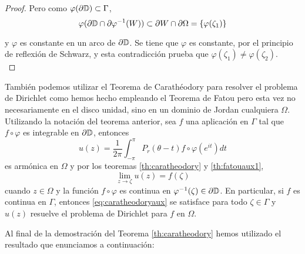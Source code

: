 \begin{proof}
    Pero como $\varphi(\partial \mathbb{D}) \subset \Gamma$,
    \begin{equation*}
        \varphi(\partial \mathbb{D} \cap \partial \varphi ^{-1} (W)) \subset \partial W \cap \partial \Omega = \{ \varphi (\zeta_1)\}
    \end{equation*}

    y $\varphi$ es constante en un arco de $\partial \mathbb{D}$. Se tiene que $\varphi$ es constante, por el principio de reflexión de Schwarz, y esta contradicción prueba que $\varphi(\zeta_1) \not = \varphi(\zeta_2)$. \\
\end{proof}


También podemos utilizar el Teorema de Carathéodory para resolver el problema de Dirichlet como hemos hecho empleando el Teorema de Fatou pero esta vez no necesariamente en el disco unidad, sino en un dominio de Jordan cualquiera $\Omega$. Utilizando la notación del teorema anterior, sea $f$ una aplicación en $\Gamma$ tal que $f \circ \varphi$ es integrable en $\partial \mathbb{D}$, entonces
\begin{equation*}
    u(z) = \dfrac{1}{2 \pi} \int_{- \pi}^{\pi} P_r (\theta - t) f \circ \varphi (e^{it}) dt
\end{equation*}
es armónica en $\Omega$ y por los teoremas \ref{th:caratheodory} y \ref{th:fatouaux1},
\begin{equation}
    \label{eq:caratheodoryaux}
    \lim_{z \to \zeta} u(z) = f(\zeta)
\end{equation}
cuando $z \in \Omega$ y la función $f \circ \varphi$ es continua en $\varphi^{-1}(\zeta) \in \partial \mathbb{D}$. En particular, si $f$ es continua en $\Gamma$, entonces \eqref{eq:caratheodoryaux} se satisface para todo $\zeta \in \Gamma$ y $u(z)$ resuelve el problema de Dirichlet para $f$ en $\Omega$. \\


Al final de la demostración del Teorema \ref{th:caratheodory} hemos utilizado el resultado que enunciamos a continuación: \\

